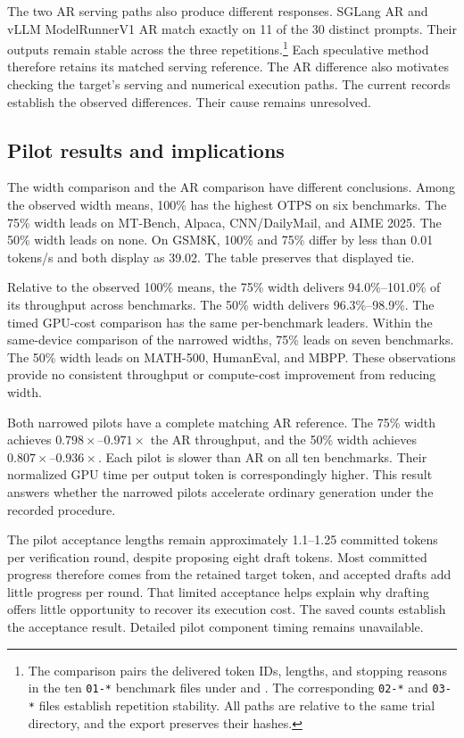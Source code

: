 \documentclass[conference,onecolumn]{IEEEtran}
\begin{document}
The two AR serving paths also produce different responses. SGLang AR and vLLM ModelRunnerV1 AR match exactly on 11 of the 30 distinct prompts. Their outputs remain stable across the three repetitions.\footnote{The comparison pairs the delivered token IDs, lengths, and stopping reasons in the ten \texttt{01-*} benchmark files under  and . The corresponding \texttt{02-*} and \texttt{03-*} files establish repetition stability. All paths are relative to the same trial directory, and the export preserves their hashes.} Each speculative method therefore retains its matched serving reference. The AR difference also motivates checking the target's serving and numerical execution paths. The current records establish the observed differences. Their cause remains unresolved.

\subsection{Pilot results and implications}
The width comparison and the AR comparison have different conclusions. Among the observed width means, 100\% has the highest OTPS on six benchmarks. The 75\% width leads on MT-Bench, Alpaca, CNN/DailyMail, and AIME 2025. The 50\% width leads on none. On GSM8K, 100\% and 75\% differ by less than 0.01 tokens/s and both display as 39.02. The table preserves that displayed tie.

Relative to the observed 100\% means, the 75\% width delivers 94.0\%--101.0\% of its throughput across benchmarks. The 50\% width delivers 96.3\%--98.9\%. The timed GPU-cost comparison has the same per-benchmark leaders. Within the same-device comparison of the narrowed widths, 75\% leads on seven benchmarks. The 50\% width leads on MATH-500, HumanEval, and MBPP. These observations provide no consistent throughput or compute-cost improvement from reducing width.

Both narrowed pilots have a complete matching AR reference. The 75\% width achieves $0.798\times$--$0.971\times$ the AR throughput, and the 50\% width achieves $0.807\times$--$0.936\times$. Each pilot is slower than AR on all ten benchmarks. Their normalized GPU time per output token is correspondingly higher. This result answers whether the narrowed pilots accelerate ordinary generation under the recorded procedure.

The pilot acceptance lengths remain approximately 1.1--1.25 committed tokens per verification round, despite proposing eight draft tokens. Most committed progress therefore comes from the retained target token, and accepted drafts add little progress per round. That limited acceptance helps explain why drafting offers little opportunity to recover its execution cost. The saved counts establish the acceptance result. Detailed pilot component timing remains unavailable.
\end{document}
